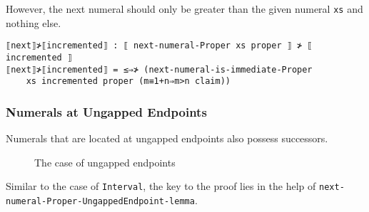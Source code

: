 \documentclass[\main/thesis.tex]{subfiles}
\begin{document}
However, the next numeral should only be greater than the given numeral
\lstinline|xs| and nothing else.

\begin{lstlisting}[basicstyle=\ttfamily\scriptsize]
⟦next⟧≯⟦incremented⟧ : ⟦ next-numeral-Proper xs proper ⟧ ≯ ⟦ incremented ⟧
⟦next⟧≯⟦incremented⟧ = ≤⇒≯ (next-numeral-is-immediate-Proper
    xs incremented proper (m≡1+n⇒m>n claim))
\end{lstlisting}

\subsubsection{Numerals at Ungapped Endpoints}

Numerals that are located at ungapped endpoints also possess successors.

\begin{figure}[H]
    \centering
    \begin{adjustbox}{max width=\textwidth}
    \end{adjustbox}
\caption{The case of ungapped endpoints}
\label{figure:28}
\end{figure}


Similar to the case of \lstinline|Interval|, the key to the proof lies in the
help of \lstinline|next-numeral-Proper-UngappedEndpoint-lemma|.
\end{document}
